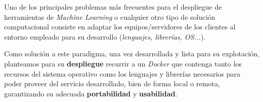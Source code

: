 Uno de los principales problemas más frecuentes para el despliegue de herramientas de \textit{Machine Learning} o cualquier otro tipo de solución computacional consiste en adaptar los equipos/servidores de los clientes al entorno empleado para su desarrollo (\textit{lenguajes, librerías, OS...}). 

Como solución a este paradigma, una vez desarrollada y lista para su explotación, planteamos para su \textbf{despliegue} recurrir a un \textit{Docker}\cite{Merkel2014Docker:Deployment} que contenga tanto los recursos del sistema operativo como los lenguajes y librerías necesarios para poder proveer del servicio desarrollado, bien de forma local o remota, garantizando su adecuada \textbf{portabilidad} y \textbf{usabilidad}.

